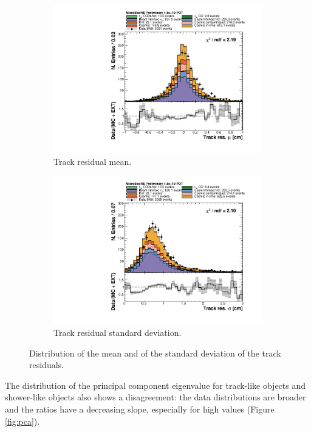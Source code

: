 \begin{figure}[htbp]
\centering
  \begin{subfigure}{0.45\textwidth}
    \includegraphics[width=\linewidth]{figures/h_track_res_mean.pdf}
    \caption{Track residual mean.} 
  \end{subfigure}
    \begin{subfigure}{0.45\textwidth}
    \includegraphics[width=\linewidth]{figures/h_track_res_std.pdf}
    \caption{Track residual standard deviation.} 
  \end{subfigure}
  \caption{Distribution of the mean and of the standard deviation of the track residuals.}\label{fig:res}
\end{figure}

The distribution of the principal component eigenvalue for track-like objects and shower-like objects also shows a disagreement: the data distributions are broader and the ratios have a decreasing slope, especially for high values (Figure \ref{fig:pca}).

